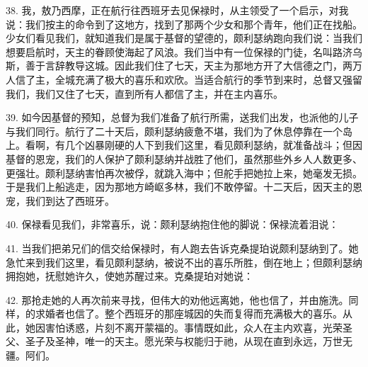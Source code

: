 38. 我，敖乃西摩，正在航行往西班牙去见保禄时，从主领受了一个启示，对我说：我们按主的命令到了这地方，找到了那两个少女和那个青年，他们正在找船。少女们看见我们，就知道我们是属于基督的望德的，颇利瑟纳跑向我们说：当我们想要启航时，天主的眷顾使海起了风浪。我们当中有一位保禄的门徒，名叫路济乌斯，善于言辞教导这城。因此我们住了七天，天主为那地方开了大信德之门，两万人信了主，全城充满了极大的喜乐和欢欣。当适合航行的季节到来时，总督又强留我们，我们又住了七天，直到所有人都信了主，并在主内喜乐。\par

39. 如今因基督的预知，总督为我们准备了航行所需，送我们出发，也派他的儿子与我们同行。航行了二十天后，颇利瑟纳疲惫不堪，我们为了休息停靠在一个岛上。看啊，有几个凶暴刚硬的人下到我们这里，看见颇利瑟纳，就准备战斗；但因基督的恩宠，我们的人保护了颇利瑟纳并战胜了他们，虽然那些外乡人人数更多、更强壮。颇利瑟纳害怕再次被俘，就跳入海中；但舵手把她拉上来，她毫发无损。于是我们上船逃走，因为那地方崎岖多林，我们不敢停留。十二天后，因天主的恩宠，我们到达了西班牙。\par

40. 保禄看见我们，非常喜乐，说：颇利瑟纳抱住他的脚说：保禄流着泪说：\par

41. 当我们把弟兄们的信交给保禄时，有人跑去告诉克桑提珀说颇利瑟纳到了。她急忙来到我们这里，看见颇利瑟纳，被说不出的喜乐所胜，倒在地上；但颇利瑟纳拥抱她，抚慰她许久，使她苏醒过来。克桑提珀对她说：\par

42. 那抢走她的人再次前来寻找，但伟大的劝他远离她，他也信了，并由施洗。同样，的求婚者也信了。整个西班牙的那座城因的失而复得而充满极大的喜乐。从此，她因害怕诱惑，片刻不离开蒙福的。事情既如此，众人在主内欢喜，光荣圣父、圣子及圣神，唯一的天主。愿光荣与权能归于祂，从现在直到永远，万世无疆。阿们。\par

